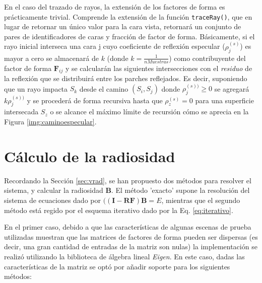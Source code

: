 En el caso del trazado de rayos, la extensión de los factores de forma es prácticamente trivial. Comprende la extensión de la función \verb|traceRay()|, que en lugar de retornar un único valor para la cara vista, retornará un conjunto de pares de identificadores de caras y fracción de factor de forma. Básicamente, si el rayo inicial interseca una cara j cuyo coeficiente de reflexión especular ($\rho_{j}^{(s)}$) es mayor a cero se almacenará de $k$ (donde $k = \frac{1}{nMuestras}$) como contribuyente del factor de forma $\mathbf{F}_{ij}$ y se calcularán las siguientes intersecciones con el \textit{residuo} de la reflexión que se distribuirá entre los parches reflejados. Es decir, suponiendo que un rayo impacta $S_{k}$ desde el camino $(S_{i}, S_{j})$ donde $\rho^{(s))}_{j} \ge 0$ se agregará $k\rho^{(s))}_{j}$ y se procederá de forma recursiva hasta que $\rho_{z}^{(s)} = 0$ para una superficie intersecada $S_{z}$ o se alcance el máximo límite de recursión cómo se aprecia en la Figura \ref{img:caminoespecular}.

\section{Cálculo de la radiosidad}

Recordando la Sección \ref{sec:vrad}, se han propuesto dos métodos para resolver el sistema, y calcular la radiosidad $\mathbf{B}$. El método 'exacto' supone la resolución del sistema de ecuaciones dado por $(\mathbf{(I - RF)B} = E$, mientras que el segundo método está regido por el esquema iterativo dado por la Eq. \eqref{eq:iterativo}.

En el primer caso, debido a que las características de algunas escenas de prueba utilizadas muestran que las matrices de factores de forma pueden ser dispersas (es decir, una gran cantidad de entradas de la matriz son nulas) la implementación se realizó utilizando la biblioteca de álgebra lineal \textit{Eigen}. En este caso, dadas las características de la matriz se optó por añadir soporte para los siguientes métodos:

